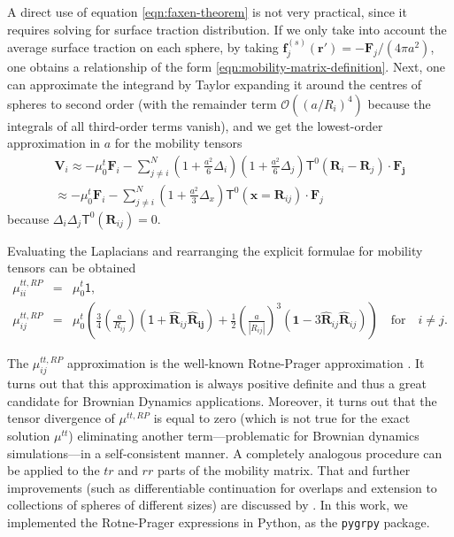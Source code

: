 \documentclass{doctoral}
\newcommand{\mm}[1]{\bm{\mathsf{#1}}} %
\begin{document}
A direct use of equation \eqref{eqn:faxen-theorem} is not very practical, since it requires solving for surface traction distribution.
If we only take into account the average surface traction on each sphere, by taking $\bm{f}_j^{(s)}(\bm{r'}) = -\bm{F}_j / (4\pi a^2)$, one obtains a relationship of the form \eqref{eqn:mobility-matrix-definition}.
Next, one can approximate the integrand by Taylor expanding it around the centres of spheres to second order (with the remainder term $\mathcal{O}((a/R_i)^4)$ because the integrals of all third-order terms vanish), and we get the lowest-order approximation in $a$ for the mobility tensors
\begin{eqnarray}
    \bm{V}_i \approx -\mu_0^t \bm{F}_i  - \sum_{j\neq i}^N (1 + \frac{a^2}{6} \Delta_i) (1 + \frac{a^2}{6} \Delta_j) \mm{T}^{0} (\bm{R}_i - \bm{R}_j) \cdot \bm{F_j} \\
    \approx -\mu_0^t \bm{F}_i  - \sum_{j\neq i}^N (1 + \frac{a^2}{3} \Delta_x) \mm{T}^{0} (\bm{x} = \bm{R}_{ij}) \cdot \bm{F}_j \label{eqn:rotne-prager-derivation}
\end{eqnarray}
because $\Delta_i \Delta_j \mm{T}^0(\bm{R}_{ij}) = 0$.

Evaluating the Laplacians and rearranging the explicit formulae for mobility tensors can be obtained
\begin{eqnarray}
    \mm{\mu}_{ii}^{tt,RP} & = & \mu_0^t \mm{1},                                                                                                                                                                                                                                                                  \\
    \mm{\mu}_{ij}^{tt,RP} & = & \mu_0^t \left( \frac{3}{4} \left( \frac{a}{R_{ij}} \right) \left( \mm{1} + \bm{\hat{R}}_{ij} \bm{\hat{R}_{ij}} \right) + \frac{1}{2} \left( \frac{a}{|R_{ij}|} \right)^3 \left( \bm{1} -3  \bm{\hat{R}}_{ij}\bm{\hat{R}}_{ij} \right) \right) \quad \mathrm{for} \quad i \neq j.
    \label{eqn:rotne-prager-translation}
\end{eqnarray}

The $\mm{\mu}_{ij}^{tt,RP}$ approximation is the well-known Rotne-Prager approximation \cite{Nagele_2013,Dhont_2008,Kim_2013}.
It turns out that this approximation is always positive definite and thus a great candidate for Brownian Dynamics applications.
Moreover, it turns out that the tensor divergence of $\mm{\mu}^{tt,RP}$ is equal to zero (which is not true for the exact solution $\mm{\mu}^{tt}$) eliminating another term––problematic for Brownian dynamics simulations––in a self-consistent manner\cite{Ermak_1978}.
A completely analogous procedure can be applied to the $tr$ and $rr$ parts of the mobility matrix. That and further improvements (such as differentiable continuation for overlaps and extension to collections of spheres of different sizes) are discussed by \textcite{Zuk_2018}. In this work, we implemented the Rotne-Prager expressions in Python, as the \texttt{pygrpy} package. 
\end{document}
